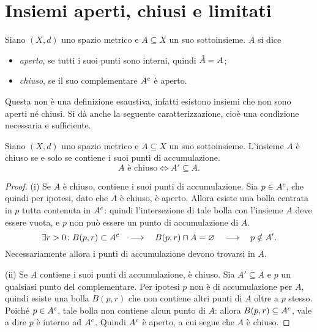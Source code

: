 \section{Insiemi aperti, chiusi e limitati}
\begin{definizione}
\label{d:chiuso-se-c-aperto}
Siano $(X,d)$ uno spazio metrico e $A\subseteq X$ un suo sottoinsieme. $A$ si dice
\begin{itemize}
\item \emph{aperto}, se tutti i suoi punti sono interni, quindi $\mathring{A}=A$;
\item \emph{chiuso}, se il suo complementare ${A}^c$ è aperto.
\end{itemize}
\end{definizione}
Questa non è una definizione esaustiva, infatti esistono insiemi che non sono aperti né chiusi. Si dà anche la seguente caratterizzazione, cioè una condizione necessaria e sufficiente.
\begin{teorema}
Siano $(X,d)$ uno spazio metrico e $A\subseteq X$ un suo sottoinsieme. L'insieme $A$ è chiuso se e solo se contiene i suoi punti di accumulazione.
\[
A\text{ è chiuso}\iff A'\subseteq A.
\]
\end{teorema}
\begin{proof}
(i) Se $A$ è chiuso, contiene i suoi punti di accumulazione.
Sia $p\in {A}^c$, che quindi per ipotesi, dato che $A$ è chiuso, è aperto. Allora esiste una bolla centrata in $p$ tutta contenuta in ${A}^c$: quindi l'intersezione di tale bolla con l'insieme $A$ deve essere vuota, e $p$ non può essere un punto di accumulazione di $A$.
\[
\exists r>0\colon B(p,r)\subset {A}^c\quad\longrightarrow\quad B(p,r)\cap A=\varnothing\quad\longrightarrow\quad p\notin A'.
\]
Necessariamente allora i punti di accumulazione devono trovarsi in $A$.

(ii) Se $A$ contiene i suoi punti di accumulazione, è chiuso.
Sia $A'\subseteq A$ e $p$ un qualsiasi punto del complementare. Per ipotesi $p$ non è di accumulazione per $A$, quindi esiste una bolla $B(p,r)$ che non contiene altri punti di $A$ oltre a $p$ stesso. Poiché $p\in {A}^c$, tale bolla non contiene alcun punto di $A$: allora $B(p,r)\subseteq {A}^c$, vale a dire $p$ è interno ad ${A}^c$. Quindi ${A}^c$ è aperto, a cui segue che $A$ è chiuso.
\end{proof}
